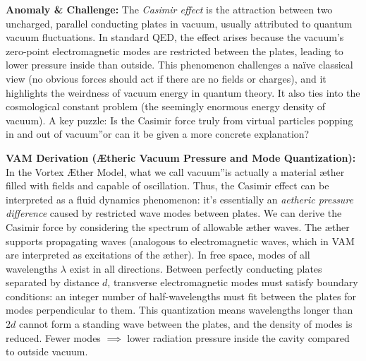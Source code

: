 \documentclass[a4paper, aps,preprint,superscriptaddress, 12pt]{revtex4}
\begin{document}
\textbf{Anomaly \& Challenge: } The \textit{Casimir effect} is the attraction between two uncharged, parallel conducting plates in vacuum, usually attributed to quantum vacuum fluctuations. In standard QED, the effect arises because the vacuum's zero-point electromagnetic modes are restricted between the plates, leading to lower pressure inside than outside. This phenomenon challenges a naïve classical view (no obvious forces should act if there are no fields or charges), and it highlights the weirdness of vacuum energy in quantum theory. It also ties into the cosmological constant problem (the seemingly enormous energy density of vacuum). A key puzzle: Is the Casimir force truly from \grqq virtual particles popping in and out of vacuum\textquotedblright or can it be given a more concrete explanation?


\textbf{VAM Derivation (Ætheric Vacuum Pressure and Mode Quantization):} In the Vortex Æther Model, what we call \grqq vacuum\textquotedblright is actually a material æther filled with fields and capable of oscillation. Thus, the Casimir effect can be interpreted as a fluid dynamics phenomenon: it's essentially an \textit{aetheric pressure difference} caused by restricted wave modes between plates. We can derive the Casimir force by considering the spectrum of allowable æther waves. The æther supports propagating waves (analogous to electromagnetic waves, which in VAM are interpreted as excitations of the æther). In free space, modes of all wavelengths $\lambda$ exist in all directions. Between perfectly conducting plates separated by distance $d$, transverse electromagnetic modes must satisfy boundary conditions: an integer number of half-wavelengths must fit between the plates for modes perpendicular to them. This quantization means wavelengths longer than $2d$ cannot form a standing wave between the plates, and the density of modes is reduced. Fewer modes $\implies$ lower radiation pressure inside the cavity compared to outside vacuum.
\end{document}
